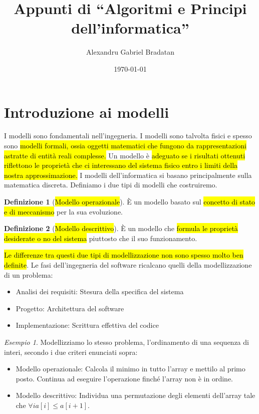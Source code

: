 \documentclass[a4paper,11pt,oneside]{article}
\title{Appunti di ``Algoritmi e Principi dell'informatica''}
\author{Alexandru Gabriel Bradatan}
\date{\today}
\theoremstyle{plain}
\theoremstyle{definition}
\newtheorem{defn}{Definizione}[section]
\theoremstyle{remark}
\newtheorem{esempio}{Esempio}[section]
\begin{document}
\maketitle
\tableofcontents
\newpage

\section{Introduzione ai modelli}\label{sec:modelli}

I modelli sono fondamentali nell'ingegneria. I modelli sono talvolta fisici e
spesso sono \hl{modelli formali, ossia oggetti matematici che fungono da
rappresentazioni astratte di entità reali complesse.} Un modello è \hl{adeguato
se i risultati ottenuti riflettono le proprietà che ci interessano del sistema
fisico entro i limiti della nostra approssimazione.} I modelli dell'informatica
si basano principalmente sulla matematica discreta. Definiamo i due tipi di
modelli che costruiremo.

\begin{defn}[\hl{Modello operazionale}]\label{def:modello-op}
  È un modello basato sul \hl{concetto di stato e di meccanismo} per la sua
  evoluzione.
\end{defn}

\begin{defn}[\hl{Modello descrittivo}]\label{def:modello-desc}
  È un modello che \hl{formula le proprietà desiderate o no del sistema}
  piuttosto che il suo funzionamento.
\end{defn}

\hl{Le differenze tra questi due tipi di modellizzazione non sono spesso molto
ben definite}. Le fasi dell'ingegneria del software ricalcano quelli della
modellizzazione di un problema:

\begin{itemize}
  \item Analisi dei requisiti: Stesura della specifica del sistema
  \item Progetto: Architettura del software
  \item Implementazione: Scrittura effettiva del codice
\end{itemize}

\begin{esempio}
  Modellizziamo lo stesso problema, l'ordinamento di una sequenza di interi,
  secondo i due criteri enunciati sopra:
  \begin{itemize}
    \item Modello operazionale: Calcola il minimo in tutto l'array e mettilo al
      primo posto. Continua ad eseguire l'operazione finché l'array non è in
      ordine.
    \item Modello descrittivo: Individua una permutazione degli elementi
      dell'array tale che \(\forall i a[i] \leq a[i+1]\).
  \end{itemize}
\end{esempio}
\end{document}

